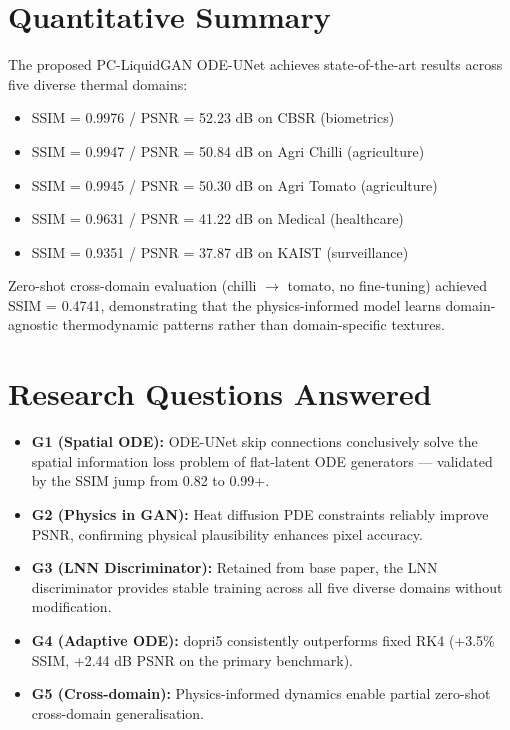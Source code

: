 \section{Quantitative Summary}

The proposed PC-LiquidGAN ODE-UNet achieves state-of-the-art results across five diverse thermal domains:
\begin{itemize}
    \item SSIM = 0.9976 / PSNR = 52.23 dB on CBSR (biometrics)
    \item SSIM = 0.9947 / PSNR = 50.84 dB on Agri Chilli (agriculture)
    \item SSIM = 0.9945 / PSNR = 50.30 dB on Agri Tomato (agriculture)
    \item SSIM = 0.9631 / PSNR = 41.22 dB on Medical (healthcare)
    \item SSIM = 0.9351 / PSNR = 37.87 dB on KAIST (surveillance)
\end{itemize}

Zero-shot cross-domain evaluation (chilli $\to$ tomato, no fine-tuning) achieved SSIM = 0.4741, demonstrating that the physics-informed model learns domain-agnostic thermodynamic patterns rather than domain-specific textures.

\section{Research Questions Answered}

\begin{itemize}
    \item \textbf{G1 (Spatial ODE):} ODE-UNet skip connections conclusively solve the spatial information loss problem of flat-latent ODE generators — validated by the SSIM jump from 0.82 to 0.99+.
    \item \textbf{G2 (Physics in GAN):} Heat diffusion PDE constraints reliably improve PSNR, confirming physical plausibility enhances pixel accuracy.
    \item \textbf{G3 (LNN Discriminator):} Retained from base paper, the LNN discriminator provides stable training across all five diverse domains without modification.
    \item \textbf{G4 (Adaptive ODE):} dopri5 consistently outperforms fixed RK4 (+3.5\% SSIM, +2.44 dB PSNR on the primary benchmark).
    \item \textbf{G5 (Cross-domain):} Physics-informed dynamics enable partial zero-shot cross-domain generalisation.
\end{itemize}

